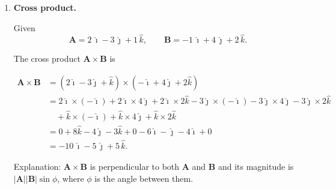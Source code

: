 \documentclass[../main.tex]{subfiles}
\begin{document}
\begin{enumerate}
\begin{enumerate}
    Compute the dot product:
    \[
      \mathbf{v}(1)\cdot \mathbf{a}(1)
      = (2a)(2a) + (3b)(6b)
      = 4a^2 + 18 b^2.
    \]

    Compute magnitudes:
    \[
      \|\mathbf{v}(1)\| = \sqrt{(2a)^2 + (3b)^2}
      = \sqrt{4a^2 + 9b^2},
    \]
    \[
      \|\mathbf{a}(1)\| = \sqrt{(2a)^2 + (6b)^2}
      = \sqrt{4a^2 + 36b^2}.
    \]

    Therefore
    \[
      \cos\theta
      = \frac{4a^2 + 18b^2}{\sqrt{4a^2 + 9b^2}\,\sqrt{4a^2 + 36b^2}}.
    \]

    So the angle $\theta$ is
    \[
      \theta = \arccos\!\left(
        \frac{4a^2 + 18b^2}{\sqrt{4a^2 + 9b^2}\,\sqrt{4a^2 + 36b^2}}
      \right).
    \]

    Interpretation: the angle depends on $a$ and $b$; if $\mathbf{a}$ is parallel to $\mathbf{v}$, then the direction of motion is speeding up with no change in direction. If not parallel, part of $\mathbf{a}$ turns the velocity.
\end{enumerate}


\item \textbf{Cross product.}

Given
\[
\mathbf{A} = 2\,\hat{\imath} - 3\,\hat{\jmath} + 1\,\hat{k},
\qquad
\mathbf{B} = -1\,\hat{\imath} + 4\,\hat{\jmath} + 2\,\hat{k}.
\]


The cross product $\mathbf{A}\times\mathbf{B}$ is


\[
\begin{aligned}
\mathbf{A}\times\mathbf{B}
&= (2\hat{\imath}-3\hat{\jmath}+\hat{k})\times(-\hat{\imath}+4\hat{\jmath}+2\hat{k}) \\
&= 2\hat{\imath}\times(-\hat{\imath}) + 2\hat{\imath}\times 4\hat{\jmath} + 2\hat{\imath}\times 2\hat{k}
  -3\hat{\jmath}\times(-\hat{\imath}) -3\hat{\jmath}\times 4\hat{\jmath} -3\hat{\jmath}\times 2\hat{k} \\
&\quad + \hat{k}\times(-\hat{\imath}) + \hat{k}\times 4\hat{\jmath} + \hat{k}\times 2\hat{k} \\
&= 0 + 8\hat{k} - 4\hat{\jmath} - 3\hat{k} + 0 - 6\hat{\imath} - \hat{\jmath} - 4\hat{\imath} + 0 \\
&= -10\,\hat{\imath} - 5\,\hat{\jmath} + 5\,\hat{k}.
\end{aligned}
\]

Explanation: $\mathbf{A}\times\mathbf{B}$ is perpendicular to both $\mathbf{A}$ and $\mathbf{B}$ and its magnitude is $|\mathbf{A}||\mathbf{B}|\sin\phi$, where $\phi$ is the angle between them.
\end{enumerate}
\end{document}
